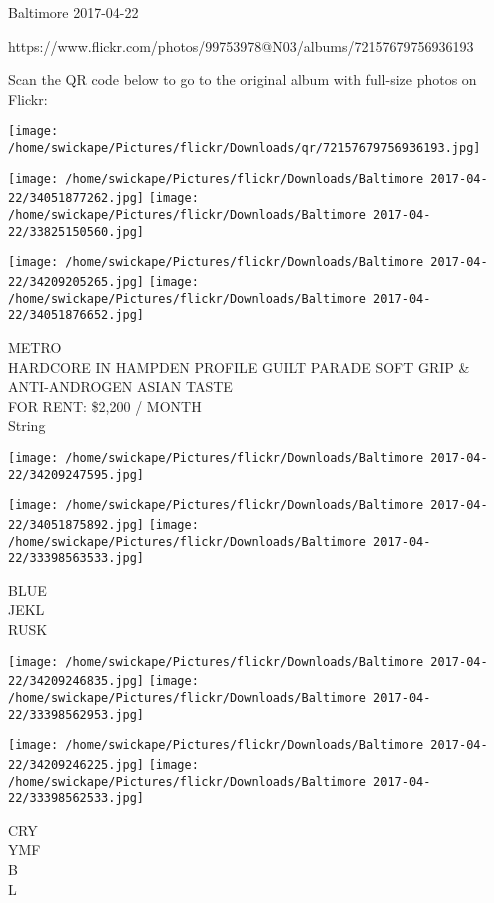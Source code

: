 \documentclass[10pt,letterpaper]{article}
\begin{document}
Baltimore 2017-04-22

https://www.flickr.com/photos/99753978@N03/albums/72157679756936193

Scan the QR code below to go to the original album with full-size photos on Flickr:

\texttt{[image: /home/swickape/Pictures/flickr/Downloads/qr/72157679756936193.jpg]}
\pagebreak

\texttt{[image: /home/swickape/Pictures/flickr/Downloads/Baltimore 2017-04-22/34051877262.jpg]}
\texttt{[image: /home/swickape/Pictures/flickr/Downloads/Baltimore 2017-04-22/33825150560.jpg]}

\texttt{[image: /home/swickape/Pictures/flickr/Downloads/Baltimore 2017-04-22/34209205265.jpg]}
\texttt{[image: /home/swickape/Pictures/flickr/Downloads/Baltimore 2017-04-22/34051876652.jpg]}

METRO\\
HARDCORE IN HAMPDEN PROFILE GUILT PARADE SOFT GRIP \& ANTI{-}ANDROGEN ASIAN TASTE\\
FOR RENT: \$2,200 / MONTH\\
String
\pagebreak

\texttt{[image: /home/swickape/Pictures/flickr/Downloads/Baltimore 2017-04-22/34209247595.jpg]}

\vspace{0.25in}
\texttt{[image: /home/swickape/Pictures/flickr/Downloads/Baltimore 2017-04-22/34051875892.jpg]}
\texttt{[image: /home/swickape/Pictures/flickr/Downloads/Baltimore 2017-04-22/33398563533.jpg]}

BLUE\\
JEKL\\
RUSK
\pagebreak

\texttt{[image: /home/swickape/Pictures/flickr/Downloads/Baltimore 2017-04-22/34209246835.jpg]}
\texttt{[image: /home/swickape/Pictures/flickr/Downloads/Baltimore 2017-04-22/33398562953.jpg]}

\texttt{[image: /home/swickape/Pictures/flickr/Downloads/Baltimore 2017-04-22/34209246225.jpg]}
\texttt{[image: /home/swickape/Pictures/flickr/Downloads/Baltimore 2017-04-22/33398562533.jpg]}

CRY\\
YMF\\
B\\
L
\pagebreak
\end{document}

